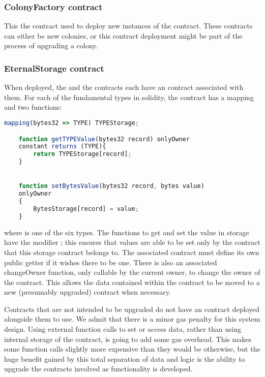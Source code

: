 \subsubsection {ColonyFactory contract}
This the contract used to deploy new instances of the  contract. These contracts can either be new colonies, or this contract deployment might be part of the process of upgrading a colony.

\subsubsection {EternalStorage contract}

When deployed, the  and the  contracts each have an  contract associated with them. For each of the fundamental types in solidity, the  contract has a mapping and two functions:

\begin{minipage}[c]{0.9\linewidth}
\begin{lstlisting}[language=JavaScript]
    mapping(bytes32 => TYPE) TYPEStorage;

    function getTYPEValue(bytes32 record) onlyOwner 
    constant returns (TYPE){
        return TYPEStorage[record];
    }


    function setBytesValue(bytes32 record, bytes value)
    onlyOwner
    {
        BytesStorage[record] = value;
    }
\end{lstlisting}
\end{minipage}

\noindent where  is one of the six types. The functions to get and set the value in storage have the modifier ; this ensures that values are able to be set only by the contract that this storage contract belongs to. The associated contract must define its own public getter if it wishes there to be one. There is also an associated changeOwner function, only callable by the current owner, to change the owner of the contract. This allows the data contained within the contract to be moved to a new (presumably upgraded) contract when necessary. 

Contracts that are not intended to be upgraded do not have an  contract deployed alongside them to use. We admit that there is a minor gas penalty for this system design. Using external function calls to set or access data, rather than using internal storage of the contract, is going to add some gas overhead. This makes some function calls slightly more expensive than they would be otherwise, but the huge benefit gained by this total separation of data and logic is the ability to upgrade the contracts involved as functionality is developed. 

